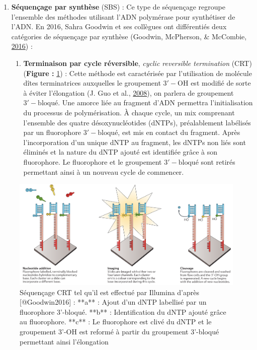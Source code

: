 \documentclass[12pt,twoside]{reedthesis}
\providecommand{\tightlist}{%
  \setlength{\itemsep}{0pt}\setlength{\parskip}{0pt}}
\theoremstyle{definition}
\theoremstyle{definition}
\theoremstyle{remark}
\begin{document}
  \begin{enumerate}
  \def\labelenumi{\arabic{enumi}.}
  \tightlist
  \item
    \textbf{Séquençage par synthèse} (SBS) : Ce type de séquençage
    regroupe l'ensemble des méthodes utilisant l'ADN polymérase pour
    synthétiser de l'ADN. En 2016, Sahra Goodwin et ses collègues ont
    différentiés deux catégories de séquençage par synthèse (Goodwin,
    McPherson, \& McCombie, \protect\hyperlink{ref-Goodwin2016}{2016}) :
  
    \begin{enumerate}
    \def\labelenumii{\alph{enumii}.}
    \tightlist
    \item
      \textbf{Terminaison par cycle réversible}, \emph{cyclic reversible
      termination} (CRT) (\textbf{Figure : }\ref{fig:crtSeq}) : Cette
      méthode est caractérisée par l'utilisation de molécule dîtes
      terminatrices auxquelles le groupement \(\mathrm{3'-OH}\) est
      modifié de sorte à éviter l'élongation (J. Guo et al.,
      \protect\hyperlink{ref-Guo2008}{2008}), on parlera de groupement
      \(\mathrm{3'-bloqué}\). Une amorce liée au fragment d'ADN permettra
      l'initialisation du processus de polymérisation. À chaque cycle, un
      mix comprenant l'ensemble des quatre désoxynucléotides (dNTPs),
      préalablement labélisés par un fluorophore \(\mathrm{3'-bloqué}\),
      est mis en contact du fragment. Après l'incorporation d'un unique
      dNTP au fragment, les dNTPs non liés sont éliminés et la nature du
      dNTP ajouté est identifiée grâce à son fluorophore. Le fluorophore
      et le groupement \(\mathrm{3'-bloqué}\) sont retirés permettant
      ainsi à un nouveau cycle de commencer.
    \end{enumerate}
  \end{enumerate}
  
  \begin{figure}
  
  {\centering \includegraphics[scale=.24]{figure/CRT_seq_illumina} 
  
  }
  
  \caption[Séquençage CRT tel qu'il est effectué par Illumina]{Séquençage CRT tel qu'il est effectué par Illumina d'après [@Goodwin2016] : **a** : Ajout d'un dNTP labellisé par un fluorophore 3'-bloqué. **b** : Identification du dNTP ajouté grâce au fluorophore. **c** : Le fluorophore est clivé du dNTP et le groupement 3'-OH est reformé à partir du groupement 3'-bloqué permettant ainsi l'élongation}\label{fig:crtSeq}
  \end{figure}
  
\end{document}
